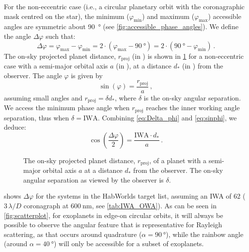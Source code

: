 \documentclass[usenatbib]{mnras}
\newcommand{\HWO}{HabWorlds\xspace}
\begin{document}
For the non-eccentric case (i.e., a circular planetary orbit with the coronagraphic mask centred on the star), the minimum ($\varphi_\mathrm{min}$) and maximum ($\varphi_\mathrm{max}$) accessible angles are symmetric about \qty{90}{\degree} (see \cref{fig:accessible_phase_angles}). 
We define the angle $\Delta \varphi$ such that: 
\begin{equation}
    \label{eq:Delta_phi}
    \Delta \varphi 
    = \varphi_\mathrm{max} - \varphi_\mathrm{min}
    =  2 \cdot (\varphi_\mathrm{max} - \qty{90}{\degree}) 
    =  2 \cdot (\qty{90}{\degree} - \varphi_\mathrm{min} )  \,.
\end{equation} 
The on-sky projected planet distance, $r_\mathrm{proj}$ (in \unit{\au}) is shown in \cref{fig:scattering-angle} for a non-eccentric case with a 
semi-major orbital axis $a$ (in \unit{\au}), at a distance $d_*$ (in \unit{\parsec}) from the observer. 
The angle $\varphi$ is given by
\begin{equation}
    \label{eq:sinphi}
    \sin(\varphi) = \frac{r_\mathrm{proj}}{a} \,,
\end{equation}
assuming small angles and $r_\mathrm{proj} = \delta d_*$, where $\delta$ is the on-sky angular separation.
We access the minimum phase angle when $r_\mathrm{proj}$ reaches the inner working angle separation, thus when $\delta = \mathrm{IWA}$. 
Combining \cref{eq:Delta_phi} and \cref{eq:sinphi}, we deduce:
\begin{equation}
    \label{eq:scattering_angle}
    \cos\left(\dfrac{\Delta \varphi}{2}\right) = \frac{\mathrm{IWA} 
    \cdot d_*}{a} \,.
\end{equation}


\begin{figure}
    \centering
    
    \caption{
        The on-sky projected planet distance, $r_\mathrm{proj}$, of a planet with a semi-major orbital axis $a$ at a distance $d_*$ from the observer.
        The on-sky angular separation as viewed by the observer is $\delta$.
    }
    \label{fig:scattering-angle}
\end{figure}


 shows $\Delta \varphi$ for the systems in the \HWO target list, assuming an IWA of \qty{62}{\mas} ($3\,\lambda / D$ coronagraph at $\qty{600}{\nano\meter}$, see \cref{tab:IWA_OWA}). 
%
%
As can be seen in \cref{fig:scatterplot}, for exoplanets in edge-on circular orbits, it will always be possible to observe the angular feature that is representative for Rayleigh scattering, as that occurs around quadrature ($\alpha=\qty{90}{\degree}$), while the rainbow angle (around $\alpha=\qty{40}{\degree}$) will only be accessible for a subset of exoplanets.
\end{document}
